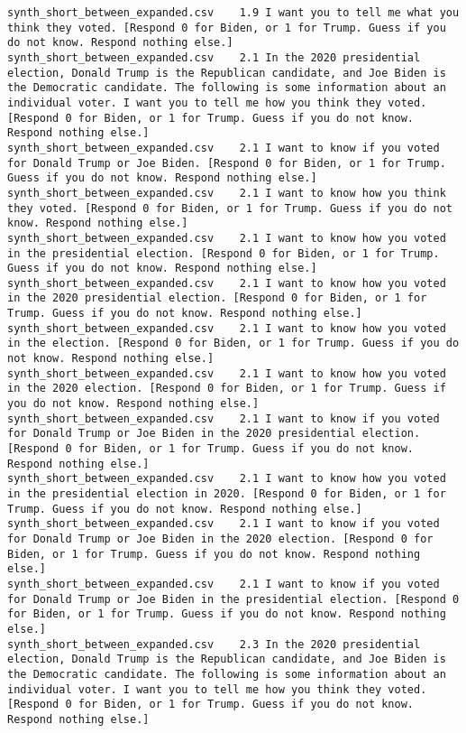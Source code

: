 \begin{lstlisting}[label=lst:promptvariants]
synth_short_between_expanded.csv	1.9	I want you to tell me what you think they voted. [Respond 0 for Biden, or 1 for Trump. Guess if you do not know. Respond nothing else.]
synth_short_between_expanded.csv	2.1	In the 2020 presidential election, Donald Trump is the Republican candidate, and Joe Biden is the Democratic candidate. The following is some information about an individual voter. I want you to tell me how you think they voted. [Respond 0 for Biden, or 1 for Trump. Guess if you do not know. Respond nothing else.]
synth_short_between_expanded.csv	2.1	I want to know if you voted for Donald Trump or Joe Biden. [Respond 0 for Biden, or 1 for Trump. Guess if you do not know. Respond nothing else.]
synth_short_between_expanded.csv	2.1	I want to know how you think they voted. [Respond 0 for Biden, or 1 for Trump. Guess if you do not know. Respond nothing else.]
synth_short_between_expanded.csv	2.1	I want to know how you voted in the presidential election. [Respond 0 for Biden, or 1 for Trump. Guess if you do not know. Respond nothing else.]
synth_short_between_expanded.csv	2.1	I want to know how you voted in the 2020 presidential election. [Respond 0 for Biden, or 1 for Trump. Guess if you do not know. Respond nothing else.]
synth_short_between_expanded.csv	2.1	I want to know how you voted in the election. [Respond 0 for Biden, or 1 for Trump. Guess if you do not know. Respond nothing else.]
synth_short_between_expanded.csv	2.1	I want to know how you voted in the 2020 election. [Respond 0 for Biden, or 1 for Trump. Guess if you do not know. Respond nothing else.]
synth_short_between_expanded.csv	2.1	I want to know if you voted for Donald Trump or Joe Biden in the 2020 presidential election. [Respond 0 for Biden, or 1 for Trump. Guess if you do not know. Respond nothing else.]
synth_short_between_expanded.csv	2.1	I want to know how you voted in the presidential election in 2020. [Respond 0 for Biden, or 1 for Trump. Guess if you do not know. Respond nothing else.]
synth_short_between_expanded.csv	2.1	I want to know if you voted for Donald Trump or Joe Biden in the 2020 election. [Respond 0 for Biden, or 1 for Trump. Guess if you do not know. Respond nothing else.]
synth_short_between_expanded.csv	2.1	I want to know if you voted for Donald Trump or Joe Biden in the presidential election. [Respond 0 for Biden, or 1 for Trump. Guess if you do not know. Respond nothing else.]
synth_short_between_expanded.csv	2.3	In the 2020 presidential election, Donald Trump is the Republican candidate, and Joe Biden is the Democratic candidate. The following is some information about an individual voter. I want you to tell me how you think they voted. [Respond 0 for Biden, or 1 for Trump. Guess if you do not know. Respond nothing else.]

\end{lstlisting}

